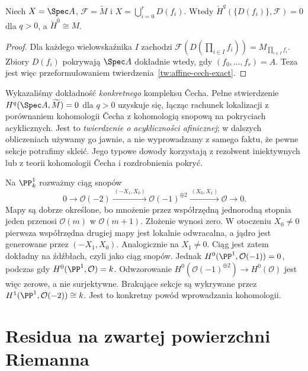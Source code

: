 \begin{wniosek}
Niech $X=\Spec A$, $\mathcal F=\widetilde M$ i
$X=\bigcup_{i=0}^rD(f_i)$. Wtedy
$\check H^q(\{D(f_i)\},\mathcal F)=0$ dla
$q>0$, a $\check H^0\cong M$.
\end{wniosek}
\begin{proof}
Dla każdego wielowskaźnika $I$ zachodzi
$\mathcal F(D(\prod_{i\in I}f_i))=M_{\prod_{i\in I}f_i}$.
Zbiory $D(f_i)$ pokrywają $\Spec A$ dokładnie wtedy,
gdy $(f_0,\ldots,f_r)=A$. Teza jest więc
przeformułowaniem twierdzenia~\ref{tw:affine-cech-exact}.
\end{proof}

\begin{uwaga}
Wykazaliśmy dokładność \emph{konkretnego} kompleksu
Čecha. Pełne stwierdzenie
$H^q(\Spec A,\widetilde M)=0$ dla $q>0$
uzyskuje się, łącząc rachunek lokalizacji z
porównaniem kohomologii Čecha z kohomologią
snopową na pokryciach acyklicznych. Jest to
\emph{twierdzenie o acykliczności afinicznej};
w dalszych obliczeniach używamy go jawnie,
a nie wyprowadzamy z samego faktu, że pewne sekcje
potrafimy skleić. Jego typowe dowody korzystają
z rezolwent iniektywnych lub z teorii kohomologii
Čecha i rozdrobnienia pokryć.
\end{uwaga}

\begin{przyklad}
Na $\PP^1_k$ rozważmy ciąg snopów
\[
0\longrightarrow\mathcal O(-2)
\xrightarrow{\,(-X_1,X_0)\,}\mathcal O(-1)^{\oplus2}
\xrightarrow{\,(X_0,X_1)\,}\mathcal O\longrightarrow0.
\]
Mapy są dobrze określone, bo mnożenie przez współrzędną
jednorodną stopnia jeden przenosi $\mathcal O(m)$ w
$\mathcal O(m+1)$. Złożenie wynosi zero.
W otoczeniu $X_0\ne0$ pierwsza współrzędna drugiej
mapy jest lokalnie odwracalna, a jądro jest generowane
przez $(-X_1,X_0)$. Analogicznie na $X_1\ne0$.
Ciąg jest zatem dokładny na źdźbłach, czyli jako
ciąg snopów. Jednak
$H^0(\PP^1,\mathcal O(-1))=0$, podczas gdy
$H^0(\PP^1,\mathcal O)=k$.
Odwzorowanie $H^0(\mathcal O(-1)^{\oplus2})\to
H^0(\mathcal O)$ jest więc zerowe, a nie surjektywne.
Brakujące sekcje są wykrywane przez
$H^1(\PP^1,\mathcal O(-2))\cong k$.
Jest to konkretny powód wprowadzania kohomologii.
\end{przyklad}

\section{Residua na zwartej powierzchni Riemanna}
\label{sec:residue-compact}

